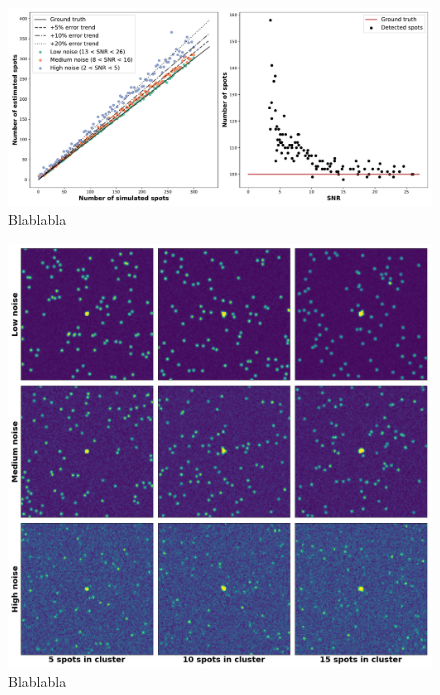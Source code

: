 \begin{figure}[h]
    \centering
    \includegraphics[width=1\textwidth]{figures/chapter2/fused_spot_detection_noise}
    \caption{Blablabla}
    \label{fig:detection_error}
\end{figure}

\begin{figure}[h]
    \centering
    \includegraphics[width=1\textwidth]{figures/chapter2/cluster_mosaic}
    \caption{Blablabla}
    \label{fig:cluster_mosaic}
\end{figure}


